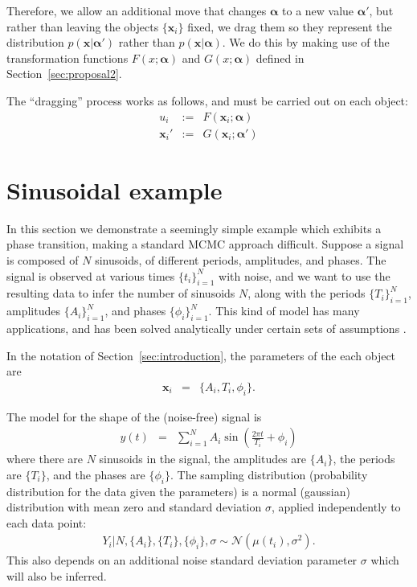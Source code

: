 \documentclass[letterpaper, 11pt]{article}
\newcommand{\hyperparams}{\boldsymbol{\alpha}}
\newcommand{\xx}{\mathbf{x}}
\begin{document}
Therefore, we allow an additional move that changes $\hyperparams$ to a new
value $\hyperparams'$, but rather than leaving the objects $\{\xx_i\}$ fixed, we
drag them so they represent the distribution $p(\xx | \hyperparams')$ rather than
$p(\xx|\hyperparams)$. We do this by making use of the transformation functions
$F(x; \hyperparams)$ and $G(x; \hyperparams)$ defined in Section~\ref{sec:proposal2}.

The ``dragging'' process works as follows, and must be carried out on
each object:
\begin{eqnarray}
u_i &:=& F(\xx_i; \hyperparams)\\
\xx_i' &:=& G(\xx_i; \hyperparams')
\end{eqnarray}

\section{Sinusoidal example}
In this section we demonstrate a seemingly simple example which exhibits
a phase transition, making a standard MCMC approach difficult. Suppose
a signal is composed of $N$ sinusoids, of different periods, amplitudes,
and phases. The signal is observed at various times $\{t_i\}_{i=1}^N$ with
noise, and we want to use the resulting data to infer the number of sinusoids
$N$, along with the periods $\{T_i\}_{i=1}^N$, amplitudes $\{A_i\}_{i=1}^N$,
and phases $\{\phi_i\}_{i=1}^N$.
This kind of model has many applications, and has been solved analytically
under certain sets of assumptions \citep[see e.g.][]{bretthorst}.

In the notation of Section~\ref{sec:introduction}, the parameters of the
each object are
\begin{eqnarray}
\xx_i &=& \{A_i, T_i, \phi_i\}.
\end{eqnarray}

The model for the shape of the (noise-free) signal is
\begin{eqnarray}
y(t) &=& \sum_{i=1}^N A_i \sin \left(\frac{2\pi t}{T_i} + \phi_i\right)
\end{eqnarray}
where there are $N$ sinusoids in the signal, the
amplitudes are $\{A_i\}$, the periods are $\{T_i\}$, and the phases are
$\{\phi_i\}$.
The sampling distribution (probability distribution for the data given the
parameters) is a normal (gaussian) distribution with mean zero and standard
deviation $\sigma$, applied independently to each data point:
\begin{eqnarray}
Y_i | N, \{A_i\}, \{T_i\}, \{\phi_i\}, \sigma \sim
\mathcal{N}\left(\mu(t_i), \sigma^2\right).
\end{eqnarray}
This also depends on an additional noise standard deviation parameter $\sigma$
which will also be inferred.
\end{document}
